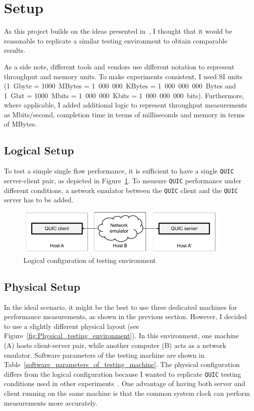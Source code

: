 \documentclass[12pt,a4paper,twoside,openright]{report}
\begin{document}
\section{Setup}

As this project builds on the ideas presented in~\cite{Making_QUIC_Quicker}, I thought that it would be reasonable to replicate a similar testing environment to obtain comparable results.

As a side note, different tools and vendors use different notation to represent throughput and memory units.
To make experiments consistent, I used SI units (1~Gbyte = 1000~MBytes = 1~000~000~KBytes = 1~000~000~000~Bytes and 1~Gbit = 1000~Mbits = 1~000~000~Kbits = 1~000~000~000~bits).
Furthermore, where applicable, I added additional logic to represent throughput measurements as Mbits/second, completion time in terms of milliseconds and memory in terms of MBytes.

\subsection{Logical Setup}
To test a simple single flow performance, it is sufficient to have a single \texttt{QUIC} server-client pair, as depicted in Figure~\ref{fig:Logical_testing_environment}.
To measure \texttt{QUIC} performance under different conditions, a network emulator between the \texttt{QUIC} client and the \texttt{QUIC} server has to be added.

    \begin{figure}[ht]
    \centering
    \includegraphics[width=0.95\textwidth]{figs/Logical_testing_environment.png}
    \caption{Logical configuration of testing environment}
    \label{fig:Logical_testing_environment}
    \end{figure}

\subsection{Physical Setup} \label{physical_setup_subsection}


    In the ideal scenario, it might be the best to use three dedicated machines for performance measurements, as shown in the previous section.
    However, I decided to use a slightly different physical layout (see Figure~\ref{fig:Physical_testing_environment}).
    In this environment, one machine (A) hosts client-server pair, while another computer (B) acts as a network emulator.
    Software parameters of the testing machine are shown in Table~\ref{software_parameters_of_testing_machine}.
    The physical configuration differs from the logical configuration because I wanted to replicate \texttt{QUIC} testing conditions used in other experiments~\cite{Making_QUIC_Quicker}.
    One advantage of having both server and client running on the same machine is that the common system clock can perform measurements more accurately. 
    
\end{document}
